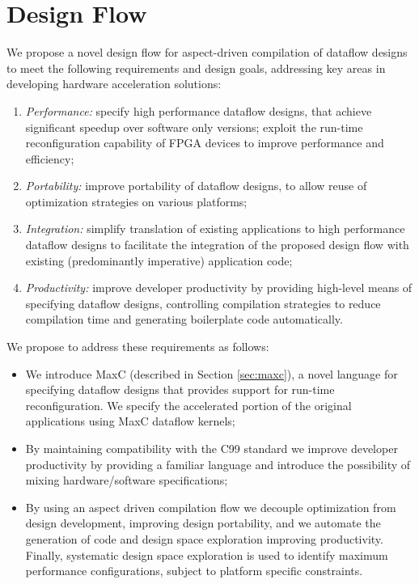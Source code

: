 \section{Design Flow}
\label{sec:design-flow}

We propose a novel design flow for aspect-driven compilation of
dataflow designs to meet the following requirements and design goals,
addressing key areas in developing hardware acceleration solutions:
\begin{enumerate}
\item \emph{Performance:} specify high performance dataflow designs, that
  achieve significant speedup over software only versions; exploit the
  run-time reconfiguration capability of FPGA devices to improve
  performance and efficiency;
\item \emph{Portability:} improve portability of dataflow designs, to
  allow reuse of optimization strategies on various platforms;
\item \emph{Integration:} simplify translation of existing
  applications to high performance dataflow designs to facilitate the
  integration of the proposed design flow with existing (predominantly
  imperative) application code;
\item \emph{Productivity:} improve developer productivity by providing
  high-level means of specifying dataflow designs, controlling
  compilation strategies to reduce compilation time and generating
  boilerplate code automatically.
\end{enumerate}

We propose to address these requirements as follows:
\begin{itemize}
\item We introduce MaxC (described in Section \ref{sec:maxc}), a novel
  language for specifying dataflow designs that provides support for
  run-time reconfiguration. We specify the accelerated portion of the
  original applications using MaxC dataflow kernels;
\item By maintaining compatibility with the C99 standard we improve
  developer productivity by providing a familiar language and
  introduce the possibility of mixing hardware/software
  specifications;
\item By using an aspect driven compilation flow we decouple
  optimization from design development, improving design portability,
  and we automate the generation of code and design space exploration
  improving productivity. Finally, systematic design space exploration
  is used to identify maximum performance configurations, subject to
  platform specific constraints.
\end{itemize}



